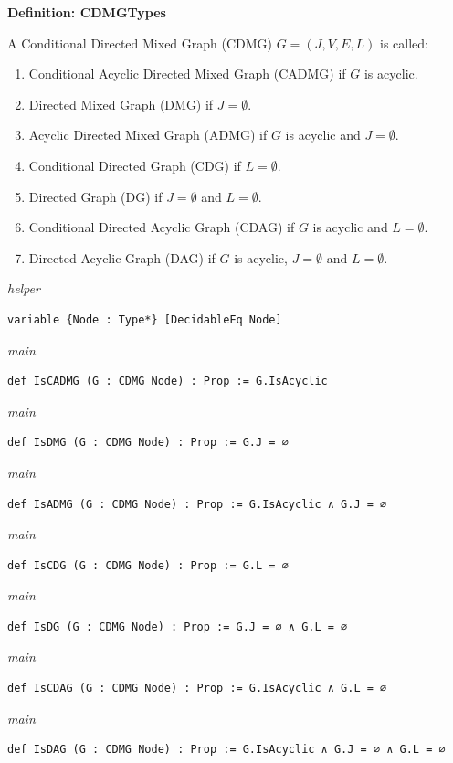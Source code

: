 \noindent\textbf{Definition: CDMGTypes}\par\smallskip
{\appendixTexSize
    A  Conditional Directed Mixed Graph (CDMG)  $G=(J,V,E,L)$  is called:
   \begin{enumerate}
       \item Conditional Acyclic Directed Mixed Graph (CADMG) if $G$ is acyclic.
       \item Directed Mixed Graph (DMG) if $J = \emptyset$.
       \item Acyclic Directed Mixed Graph (ADMG) if $G$ is acyclic and $J = \emptyset$.
       \item Conditional Directed Graph (CDG) if $L = \emptyset$.
       \item Directed Graph (DG) if $J = \emptyset$ and $L = \emptyset$.
       \item Conditional Directed Acyclic Graph (CDAG) if $G$ is acyclic and $L = \emptyset$.
       \item Directed Acyclic Graph (DAG) if $G$ is acyclic, $J=\emptyset$ and $L = \emptyset$.
   \end{enumerate}
\par}
\smallskip
{\small\textit{helper}}
\begin{verbatim}
variable {Node : Type*} [DecidableEq Node]
\end{verbatim}
{\small\textit{main}}
\begin{verbatim}
def IsCADMG (G : CDMG Node) : Prop := G.IsAcyclic
\end{verbatim}
{\small\textit{main}}
\begin{verbatim}
def IsDMG (G : CDMG Node) : Prop := G.J = ∅
\end{verbatim}
{\small\textit{main}}
\begin{verbatim}
def IsADMG (G : CDMG Node) : Prop := G.IsAcyclic ∧ G.J = ∅
\end{verbatim}
{\small\textit{main}}
\begin{verbatim}
def IsCDG (G : CDMG Node) : Prop := G.L = ∅
\end{verbatim}
{\small\textit{main}}
\begin{verbatim}
def IsDG (G : CDMG Node) : Prop := G.J = ∅ ∧ G.L = ∅
\end{verbatim}
{\small\textit{main}}
\begin{verbatim}
def IsCDAG (G : CDMG Node) : Prop := G.IsAcyclic ∧ G.L = ∅
\end{verbatim}
{\small\textit{main}}
\begin{verbatim}
def IsDAG (G : CDMG Node) : Prop := G.IsAcyclic ∧ G.J = ∅ ∧ G.L = ∅
\end{verbatim}
~%

